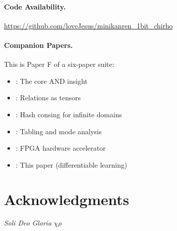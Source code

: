 \documentclass[11pt,a4paper]{article}
\begin{document}
\paragraph{Code Availability.}
\url{https://github.com/loveJesus/minikanren_1bit_chirho}

\paragraph{Companion Papers.}
This is Paper F of a six-paper suite:
\begin{itemize}
  \item \paperA{}: The core AND insight
  \item \paperB{}: Relations as tensors
  \item \paperC{}: Hash consing for infinite domains
  \item \paperD{}: Tabling and mode analysis
  \item \paperE{}: FPGA hardware accelerator
  \item \paperF{}: This paper (differentiable learning)
\end{itemize}

\section*{Acknowledgments}

\standardacknowledgments





\vspace{1em}
\begin{center}
\textit{Soli Deo Gloria} $\chi\rho$
\end{center}
\end{document}
